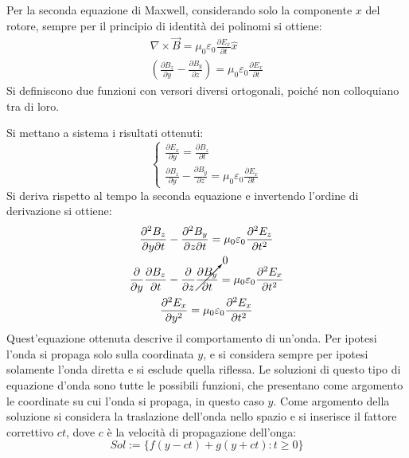 \documentclass{article}
\numberwithin{equation}{subsection}
\begin{document}
Per la seconda equazione di Maxwell, considerando solo la componente $x$ del rotore, sempre per il principio di identità dei polinomi si ottiene:
\begin{gather*}
    \nabla\times\vec{B}=\mu_0\varepsilon_0\displaystyle\frac{\partial E_x}{\partial t}\hat{x}\\
    \left(\displaystyle\frac{\partial B_z}{\partial y}-\frac{\partial B_y}{\partial z}\right)=\mu_0\varepsilon_0\frac{\partial E_x}{\partial t}
\end{gather*}
Si definiscono due funzioni con versori diversi ortogonali, poiché non colloquiano tra di loro. 

Si mettano a sistema i risultati ottenuti:
\begin{equation*}
    \begin{cases}
        \displaystyle\frac{\partial E_x}{\partial y}=\frac{\partial B_z}{\partial t}\\
        \displaystyle\frac{\partial B_z}{\partial y}-\frac{\partial B_y}{\partial z}=\mu_0\varepsilon_0\frac{\partial E_x}{\partial t}
    \end{cases}
\end{equation*}
Si deriva rispetto al tempo la seconda equazione e invertendo l'ordine di derivazione si ottiene:
\begin{gather*}
    \displaystyle\frac{\partial^2B_z}{\partial y\partial t}-\frac{\partial^2B_y}{\partial z\partial t}=\mu_0\varepsilon_0\frac{\partial^2E_z}{\partial t^2}\\
    \displaystyle\frac{\partial}{\partial y}\frac{\partial B_z}{\partial t}-\frac{\partial}{\partial z}\cancelto{0}{\frac{\partial B_y}{\partial t}}=\mu_0\varepsilon_0\frac{\partial^2E_x}{\partial t^2}\\
    \displaystyle\frac{\partial^2E_x}{\partial y^2}=\mu_0\varepsilon_0\frac{\partial^2E_x}{\partial t^2}
\end{gather*}
Quest'equazione ottenuta descrive il comportamento di un'onda. Per ipotesi l'onda si propaga solo sulla coordinata $y$, e si considera sempre per ipotesi solamente l'onda 
diretta e si esclude quella riflessa. Le soluzioni di questo tipo di equazione d'onda sono tutte le possibili funzioni, che presentano come argomento le coordinate su cui 
l'onda si propaga, in questo caso $y$. Come argomento della soluzione si considera la traslazione dell'onda nello spazio e si inserisce il fattore correttivo $ct$, dove 
$c$ è la velocità di propagazione dell'onga:
\begin{equation*}
    Sol:=\{f(y-ct)+g(y+ct):t\geq0\}
\end{equation*}  
\end{document}
